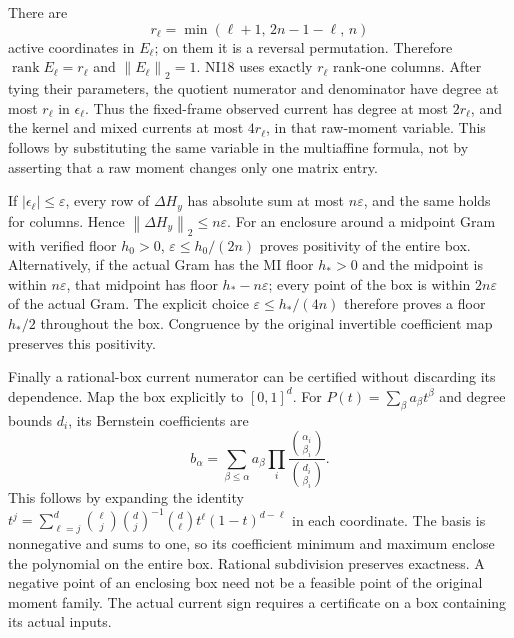 \documentclass[11pt]{article}
\newcommand{\norm}[1]{\left\lVert#1\right\rVert}
\begin{document}
There are
\[
 r_\ell=\min(\ell+1,\,2n-1-\ell,\,n)
\]
active coordinates in \(E_\ell\); on them it is a reversal permutation.
Therefore \(\operatorname{rank}E_\ell=r_\ell\) and
\(\norm{E_\ell}_2=1\). NI18 uses exactly \(r_\ell\) rank-one columns.
After tying their parameters, the quotient numerator and denominator
have degree at most \(r_\ell\) in \(\epsilon_\ell\).
Thus the fixed-frame observed current has degree at most
\(2r_\ell\), and the kernel and mixed currents at most \(4r_\ell\),
in that raw-moment variable. This follows by substituting the same
variable in the multiaffine formula, not by asserting that a raw
moment changes only one matrix entry.

If \(|\epsilon_\ell|\le\varepsilon\), every row of \(\Delta H_y\)
has absolute sum at most \(n\varepsilon\), and the same holds for
columns. Hence \(\norm{\Delta H_y}_2\le n\varepsilon\).
For an enclosure around a midpoint Gram with verified floor \(h_0>0\),
\(\varepsilon\le h_0/(2n)\) proves positivity of the entire box.
Alternatively, if the actual Gram has the MI floor \(h_*>0\) and
the midpoint is within \(n\varepsilon\), that midpoint has floor
\(h_*-n\varepsilon\); every point of the box is within
\(2n\varepsilon\) of the actual Gram.
The explicit choice \(\varepsilon\le h_*/(4n)\) therefore proves
a floor \(h_*/2\) throughout the box. Congruence by the original
invertible coefficient map preserves this positivity.

Finally a rational-box current numerator can be certified without
discarding its dependence. Map the box explicitly to \([0,1]^d\).
For \(P(t)=\sum_\beta a_\beta t^\beta\) and degree bounds \(d_i\),
its Bernstein coefficients are
\begin{equation}\tag{NI19}
 b_\alpha=\sum_{\beta\le\alpha}a_\beta
 \prod_i\frac{\binom{\alpha_i}{\beta_i}}{\binom{d_i}{\beta_i}}.
\end{equation}
This follows by expanding the identity
\(t^j=\sum_{\ell=j}^d\binom{\ell}{j}\binom d j^{-1}
\binom d\ell t^\ell(1-t)^{d-\ell}\) in each coordinate.
The basis is nonnegative and sums to one, so its coefficient minimum
and maximum enclose the polynomial on the entire box.
Rational subdivision preserves exactness.
A negative point of an enclosing box need not be a feasible point
of the original moment family. The actual current sign requires
a certificate on a box containing its actual inputs.
\end{document}
